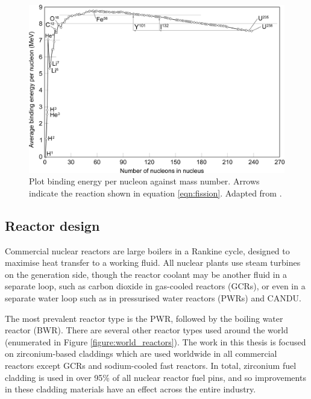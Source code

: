 \begin{figure}[htp]
\centering
\includegraphics[width=14cm]{images/Binding_energy_curve.png}
\caption[Plot binding energy per nucleon against mass number. Arrows indicate the reaction shown in equation \ref{eqn:fission}.]{Plot binding energy per nucleon against mass number. Arrows indicate the reaction shown in equation \ref{eqn:fission}. Adapted from \cite{Fastfission}.}
\label{figure:bindingenergy}
\end{figure}


\subsection{Reactor design} %

Commercial nuclear reactors are large boilers in a Rankine cycle, designed to maximise heat transfer to a working fluid. All nuclear plants use steam turbines on the generation side, though the reactor coolant may be another fluid in a separate loop, such as carbon dioxide in gas-cooled reactors (GCRs), or even in a separate water loop such as in pressurised water reactors (PWRs) and CANDU. 

The most prevalent reactor type is the PWR, followed by the boiling water reactor (BWR). There are several other reactor types used around the world (enumerated in Figure \ref{figure:world_reactors}). The work in this thesis is focused on zirconium-based claddings which are used worldwide in all commercial reactors except GCRs and sodium-cooled fast reactors. In total, zirconium fuel cladding is used in over 95\% of all nuclear reactor fuel pins, and so improvements in these cladding materials have an effect across the entire industry.

